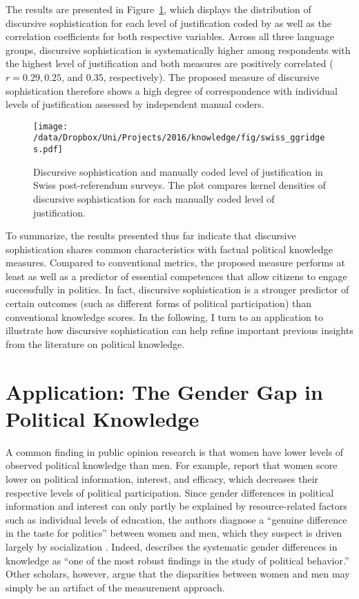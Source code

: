 The results are presented in Figure~\ref{fig:swiss_ggridges}, which displays the distribution of discursive sophistication for each level of justification coded by \citet{colombo2016justifications} as well as the correlation coefficients for both respective variables. Across all three language groups, discursive sophistication is systematically higher among respondents with the highest level of justification and both measures are positively correlated ($r=0.29, 0.25$, and $0.35$, respectively). The proposed measure of discursive sophistication therefore shows a high degree of correspondence with individual levels of justification assessed by independent manual coders.

\begin{figure}[h]\centering
\texttt{[image: /data/Dropbox/Uni/Projects/2016/knowledge/fig/swiss\_ggridges.pdf]}
\caption[Discursive sophistication and manually coded level of justification in Swiss post-referendum surveys]{Discursive sophistication and manually coded level of justification \citep{colombo2016justifications} in Swiss post-referendum surveys. The plot compares kernel densities of discursive sophistication for each manually coded level of justification.}\label{fig:swiss_ggridges}
\end{figure}

To summarize, the results presented thus far indicate that discursive sophistication shares common characteristics with factual political knowledge measures. Compared to conventional metrics, the proposed measure performs at least as well as a predictor of essential competences that allow citizens to engage successfully in politics. In fact, discursive sophistication is a stronger predictor of certain outcomes (such as different forms of political participation) than conventional knowledge scores. In the following, I turn to an application to illustrate how discursive sophistication can help refine important previous insights from the literature on political knowledge.

\section*{Application: The Gender Gap in Political Knowledge}

A common finding in public opinion research is that women have lower levels of observed political knowledge than men. For example, \citet{verba1997knowing} report that women score lower on political information, interest, and efficacy, which decreases their respective levels of political participation. Since gender differences in political information and interest can only partly be explained by resource-related factors such as individual levels of education, the authors diagnose a ``genuine difference in the taste for politics'' between women and men, which they suspect is driven largely by socialization \citep[see also][]{wolak2011roots}. Indeed, \citet[117]{dow2009gender} describes the systematic gender differences in knowledge as ``one of the most robust findings in the study of political behavior.'' Other scholars, however, argue that the disparities between women and men may simply be an artifact of the measurement approach.

